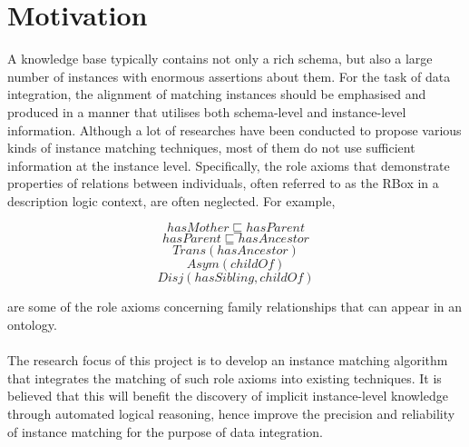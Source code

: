

\section{Motivation}

A knowledge base typically contains not only a rich schema, but also a large number of instances with enormous assertions about them. For the task of data integration, the alignment of matching instances should be emphasised and produced in a manner that utilises both schema-level and instance-level information. Although a lot of researches have been conducted to propose various kinds of instance matching techniques, most of them do not use sufficient information at the instance level. Specifically, the role axioms that demonstrate properties of relations between individuals, often referred to as the RBox in a description logic context, are often neglected. For example,

\begin{spacing}{1.2}
$$hasMother \sqsubseteq hasParent$$
$$hasParent \sqsubseteq hasAncestor$$
$$Trans(hasAncestor)$$
$$Asym(childOf)$$
$$Disj(hasSibling, childOf)$$
\end{spacing}

are some of the role axioms concerning family relationships that can appear in an ontology.
\\\\
The research focus of this project is to develop an instance matching algorithm that integrates the matching of such role axioms into existing techniques. It is believed that this will benefit the discovery of implicit instance-level knowledge through automated logical reasoning, hence improve the precision and reliability of instance matching for the purpose of data integration.


